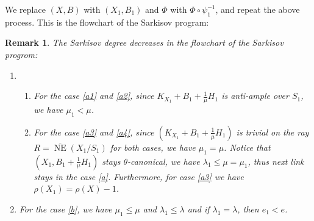 \documentclass[11pt]{amsart}
\newtheorem{rmk}[defn]{Remark}
\begin{document}
We replace $(X,B)$ with $(X_1,B_1)$ and $\Phi$ with $\Phi\circ\psi_1^{-1}$, and repeat the above process. This is the flowchart of the Sarkisov program:
\begin{rmk} \label{R-Sarkisovdeg}
  The Sarkisov degree decreases in the flowchart of the Sarkisov progrom:
\begin{enumerate}
  \item 
  \begin{enumerate}
    \item For the case \ref{a1} and \ref{a2},  since $ K_{X_1}+B_1+\frac{1}{\mu}H_1 $ is anti-ample over $S_1$, we have    $\mu_1<\mu$.
    \item For the case \ref{a3} and \ref{a4}, since $ (K_{X_1}+B_1+\frac{1}{\mu}H_1) $ is trivial on the ray $ R=\overline{\operatorname{NE}}(X_1/S_1) $ for both cases, we have $\mu_1=\mu$.
      Notice that $ (X_1,B_1+\frac{1}{\mu}H_1) $ stays $ \theta $-canonical, we have $\lambda_1\leqslant \mu=\mu_1$, thus next link stays in the case \ref{a}. Furthermore,   for case \ref{a3} we have $\rho(X_1)=\rho(X)-1$.
  \end{enumerate} 
\item For the case \ref{b}, we have  $\mu_1\leqslant \mu$ and $\lambda_1\leqslant \lambda$ and if $ \lambda_1=\lambda $, then   $e_1<e$.
\end{enumerate}
\end{rmk}
\end{document}
